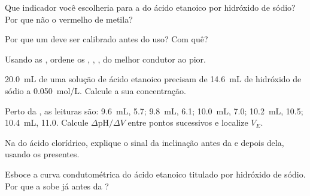 \begin{exercise}[$\star$]\label{exo:g12:ph-conductivity-titrations:3}
Que indicador você escolheria para a  do ácido etanoico por
hidróxido de sódio? Por que não o vermelho de metila?
\end{exercise}

\begin{exercise}[$\star$]\label{exo:g12:ph-conductivity-titrations:4}
Por que um  deve ser calibrado antes do uso? Com quê?
\end{exercise}

\begin{exercise}[$\star$]\label{exo:g12:ph-conductivity-titrations:5}
Usando as , ordene os  ,
, ,  do melhor condutor ao pior.
\end{exercise}

\begin{exercise}[$\star\star$]\label{exo:g12:ph-conductivity-titrations:6}
\qty{20.0}{mL} de uma solução de ácido etanoico precisam de
\qty{14.6}{mL} de hidróxido de sódio a \qty{0.050}{mol/L}. Calcule a sua
concentração.
\end{exercise}

\begin{exercise}[$\star\star$]\label{exo:g12:ph-conductivity-titrations:7}
Perto da , as leituras são: \qty{9.6}{mL},  5.7;
\qty{9.8}{mL}, 6.1; \qty{10.0}{mL}, 7.0; \qty{10.2}{mL}, 10.5;
\qty{10.4}{mL}, 11.0. Calcule $\Delta\mathrm{pH}/\Delta V$ entre pontos
sucessivos e localize $V_E$.
\end{exercise}

\begin{exercise}[$\star\star$]\label{exo:g12:ph-conductivity-titrations:8}
Na  do ácido clorídrico, explique o sinal da
inclinação antes da  e depois dela, usando os 
presentes.
\end{exercise}

\begin{exercise}[$\star\star$]\label{exo:g12:ph-conductivity-titrations:9}
Esboce a curva condutométrica do ácido etanoico titulado por hidróxido
de sódio. Por que a  sobe já antes da ?
\end{exercise}

